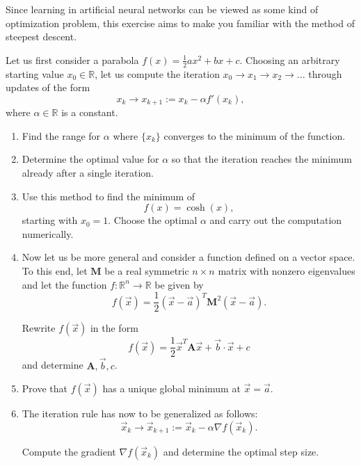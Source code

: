 \begin{Problem}
	Since learning in artificial neural networks can be viewed as some kind of optimization problem, this exercise aims to make you familiar with the method of steepest descent.
	
	Let us first consider a parabola $f(x)=\frac12 ax^2+bx+c$. Choosing an arbitrary starting value $x_0\in\mathbb R$, let us compute the iteration $x_0 \to x_1 \to x_2 \to \dots$ through updates of the form
	\[
	x_k \to x_{k+1}:=x_k-\alpha f'(x_k),
	\]
	where $\alpha\in\mathbb R$ is a constant.
	
	\begin{enumerate}
		\item[(a)] Find the range for $\alpha$ where $\{x_k\}$ converges to the minimum of the function.
		
		\item[(b)] Determine the optimal value for $\alpha$ so that the iteration reaches the minimum already after a single iteration.
		
		\item[(c)] Use this method to find the minimum of
		\[
		f(x)=\cosh(x),
		\]
		starting with $x_0=1$. Choose the optimal $\alpha$ and carry out the computation numerically.
		
		\item[(d)] Now let us be more general and consider a function defined on a vector space. To this end, let $\mathbf M$ be a real symmetric $n\times n$ matrix with nonzero eigenvalues and let the function $f:\mathbb R^n\to\mathbb R$ be given by
		\[
		f(\vec x)=\frac12(\vec x-\vec a)^T \mathbf{M}^2 (\vec x-\vec a).
		\]
		
		Rewrite $f(\vec x)$ in the form
		\[
		f(\vec x)=\frac12 \vec x^T \mathbf{A} \vec x+\vec b\cdot \vec x+c
		\]
		and determine $\mathbf{A},\vec b,c$.
		
		\item[(e)] Prove that $f(\vec x)$ has a unique global minimum at $\vec x=\vec a$.
		
		\item[(f)] The iteration rule has now to be generalized as follows:
		\[
		\vec x_k \to \vec x_{k+1}:=\vec x_k-\alpha \nabla f(\vec x_k).
		\]
		
		Compute the gradient $\nabla f(\vec x_k)$ and determine the optimal step size.
	\end{enumerate}
\end{Problem}
